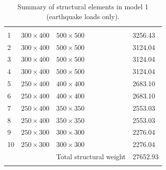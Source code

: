 \documentclass{cup-pan}
\begin{document}
\renewcommand{\arraystretch}{1}
\begin{longtable}{P{0.75in} P{1.25in} P{1.25in} P{1.25in}}
\caption{Summary of structural elements in model 1 (earthquake loads only).}\\
\headrow {} &  &  &  \\
1 & $300 \times 400$ & $500 \times 500$ & \num{3256.43}  \\
2 & $300 \times 400$ & $500 \times 500$ & \num{3124.04}  \\
3 & $300 \times 400$ & $500 \times 500$ & \num{3124.04}  \\
4 & $300 \times 400$ & $500 \times 500$ & \num{3124.04}  \\
5 & $250 \times 400$ & $400 \times 400$ & \num{2683.10}  \\
6 & $250 \times 400$ & $400 \times 400$ & \num{2683.10}  \\
7 & $250 \times 400$ & $350 \times 350$ & \num{2553.03}  \\
8 & $250 \times 400$ & $350 \times 350$ & \num{2553.03}  \\
9 & $250 \times 300$ & $300 \times 300$ & \num{2276.04}  \\
10 & $250 \times 300$ & $300 \times 300$ & \num{2276.04}  \\
 &  & Total structural weight & \num{27652.93}  \\
\label{tab:cross section model 1}
\end{longtable}
\end{document}
